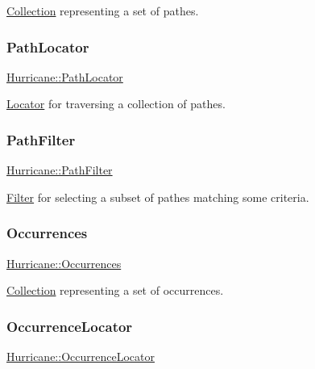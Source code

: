 \mbox{\hyperlink{classHurricane_1_1Collection}{Collection}} representing a set of pathes. \mbox{\label{namespaceHurricane_a4077fe144cc9efa686ec63667b7dd9bf}} 
\subsubsection{\texorpdfstring{Path\+Locator}{PathLocator}}
{\footnotesize\ttfamily \mbox{\hyperlink{namespaceHurricane_a4077fe144cc9efa686ec63667b7dd9bf}{Hurricane\+::\+Path\+Locator}}}

\mbox{\hyperlink{classHurricane_1_1Locator}{Locator}} for traversing a collection of pathes. \mbox{\label{namespaceHurricane_af42ed7a6acaba43b9d5f30b789105bc1}} 
\subsubsection{\texorpdfstring{Path\+Filter}{PathFilter}}
{\footnotesize\ttfamily \mbox{\hyperlink{namespaceHurricane_af42ed7a6acaba43b9d5f30b789105bc1}{Hurricane\+::\+Path\+Filter}}}

\mbox{\hyperlink{classHurricane_1_1Filter}{Filter}} for selecting a subset of pathes matching some criteria. \mbox{\label{namespaceHurricane_a1912927c128eee859af62dbe4cbe0a6b}} 
\subsubsection{\texorpdfstring{Occurrences}{Occurrences}}
{\footnotesize\ttfamily \mbox{\hyperlink{namespaceHurricane_a1912927c128eee859af62dbe4cbe0a6b}{Hurricane\+::\+Occurrences}}}

\mbox{\hyperlink{classHurricane_1_1Collection}{Collection}} representing a set of occurrences. \mbox{\label{namespaceHurricane_aa3f9cf43b9c8f3050da0a2549bb3d64d}} 
\subsubsection{\texorpdfstring{Occurrence\+Locator}{OccurrenceLocator}}
{\footnotesize\ttfamily \mbox{\hyperlink{namespaceHurricane_aa3f9cf43b9c8f3050da0a2549bb3d64d}{Hurricane\+::\+Occurrence\+Locator}}}

